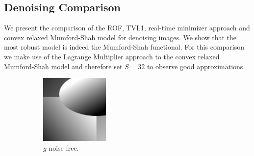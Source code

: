 \documentclass[abstracton]{scrreprt}
\begin{document}

        \subsection{Denoising Comparison} %
        \label{sub:denoising_comparison}
            We present the comparison of the ROF, TVL1, real-time minimizer approach and convex relaxed Mumford-Shah model for denoising images. We show that the most robust model is indeed the Mumford-Shah functional. For this comparison we make use of the Lagrange Multiplier approach to the convex relaxed Mumford-Shah model and therefore set $S = 32$ to observe good approximations.\\
            \begin{figure}[!ht]
                \centering
                \begin{subfigure}[b]{0.29\textwidth}
                    \includegraphics[width=\textwidth]{img/images/synth.png}
                    \caption{$g$ noise free.}
                \end{subfigure}
                \begin{subfigure}[b]{0.29\textwidth}

\end{subfigure}
\end{figure}
\end{document}

